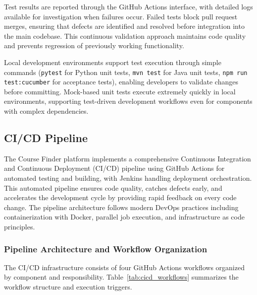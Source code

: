 \documentclass[12pt,a4paper]{article}
\begin{document}
Test results are reported through the GitHub Actions interface, with detailed logs available for investigation when failures occur. Failed tests block pull request merges, ensuring that defects are identified and resolved before integration into the main codebase. This continuous validation approach maintains code quality and prevents regression of previously working functionality.\newline

Local development environments support test execution through simple commands (\texttt{pytest} for Python unit tests, \texttt{mvn test} for Java unit tests, \texttt{npm run test:cucumber} for acceptance tests), enabling developers to validate changes before committing. Mock-based unit tests execute extremely quickly in local environments, supporting test-driven development workflows even for components with complex dependencies.

\subsection{CI/CD Pipeline}

The Course Finder platform implements a comprehensive Continuous Integration and Continuous Deployment (CI/CD) pipeline using GitHub Actions for automated testing and building, with Jenkins handling deployment orchestration. This automated pipeline ensures code quality, catches defects early, and accelerates the development cycle by providing rapid feedback on every code change. The pipeline architecture follows modern DevOps practices including containerization with Docker, parallel job execution, and infrastructure as code principles.

\subsubsection{Pipeline Architecture and Workflow Organization}

The CI/CD infrastructure consists of four GitHub Actions workflows organized by component and responsibility. Table~\ref{tab:cicd_workflows} summarizes the workflow structure and execution triggers.\newline
\end{document}
